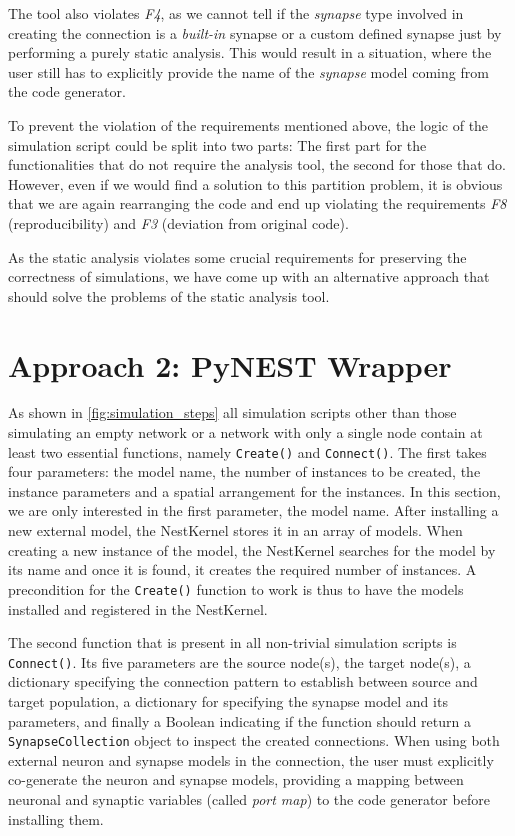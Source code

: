 The tool also violates \emph{F4}, as we cannot tell if the \emph{synapse} type involved in creating the connection is a \emph{built-in} synapse or a custom defined synapse just by performing a purely static analysis. This would result in a situation, where the user still has to explicitly provide the name of the \emph{synapse} model coming from the code generator.

To prevent the violation of the requirements mentioned above, the logic of the simulation script could be split into two parts: The first part for the functionalities that do not require the analysis tool, the second for those that do. However, even if we would find a solution to this partition problem, it is obvious that we are again rearranging the code and end up violating the requirements \emph{F8} (reproducibility) and \emph{F3} (deviation from original code).

As the static analysis violates some crucial requirements for preserving the correctness of simulations, we have come up with an alternative approach that should solve the problems of the static analysis tool.


\section{Approach 2: PyNEST Wrapper}

As shown in \autoref{fig:simulation_steps} all simulation scripts other than those simulating an empty network or a network with only a single node contain at least two essential functions, namely \texttt{Create()} and \texttt{Connect()}. The first takes four parameters: the model name, the number of instances to be created, the instance parameters and a spatial arrangement for the instances. In this section, we are only interested in the first parameter, the model name. After installing a new external model, the NestKernel stores it in an array of models. When creating a new instance of the model, the NestKernel searches for the model by its name and once it is found, it creates the required number of instances. A precondition for the \texttt{Create()} function to work is thus to have the models installed and registered in the NestKernel.

The second function that is present in all non-trivial simulation scripts is \texttt{Connect()}. Its five parameters are the source node(s), the target node(s), a dictionary specifying the connection pattern to establish between source and target population, a dictionary for specifying the synapse model and its parameters, and finally a Boolean indicating if the function should return a \texttt{SynapseCollection} object to inspect the created connections. When using both external neuron and synapse models in the connection, the user must explicitly co-generate the neuron and synapse models, providing a mapping between neuronal and synaptic variables (called \emph{port map}) to the code generator before installing them.

